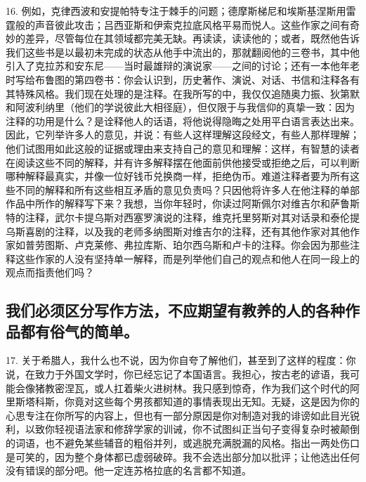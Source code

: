 16. 例如，克律西波和安提帕特专注于棘手的问题；德摩斯梯尼和埃斯基涅斯用雷霆般的声音彼此攻击；吕西亚斯和伊索克拉底风格平易而悦人。这些作家之间有奇妙的差异，尽管每位在其领域都完美无缺。再读读，读读他的；或者，既然他告诉我们这些书是以最初未完成的状态从他手中流出的，那就翻阅他的三卷书，其中他引入了克拉苏和安东尼——当时最雄辩的演说家——之间的讨论；还有一本他年老时写给布鲁图的第四卷书：你会认识到，历史著作、演说、对话、书信和注释各有其特殊风格。我们现在处理的是注释。在我所写的中，我仅仅追随奥力振、狄第默和阿波利纳里（他们的学说彼此大相径庭），但仅限于与我信仰的真挚一致：因为注释的功用是什么？是诠释他人的话语，将他说得隐晦之处用平白语言表达出来。因此，它列举许多人的意见，并说：有些人这样理解这段经文，有些人那样理解；他们试图用如此这般的证据或理由来支持自己的意见和理解：这样，有智慧的读者在阅读这些不同的解释，并有许多解释摆在他面前供他接受或拒绝之后，可以判断哪种解释最真实，并像一位好钱币兑换商一样，拒绝伪币。难道注释者要为所有这些不同的解释和所有这些相互矛盾的意见负责吗？只因他将许多人在他注释的单部作品中所作的解释写下来？我想，当你年轻时，你读过阿斯佩尔对维吉尔和萨鲁斯特的注释，武尔卡提乌斯对西塞罗演说的注释，维克托里努斯对其对话录和泰伦提乌斯喜剧的注释，以及我的老师多纳图斯对维吉尔的注释，还有其他作家对其他作家如普劳图斯、卢克莱修、弗拉库斯、珀尔西乌斯和卢卡的注释。你会因为那些注释这些作家的人没有坚持单一解释，而是列举他们自己的观点和他人在同一段上的观点而指责他们吗？\par


\subsection{我们必须区分写作方法，不应期望有教养的人的各种作品都有俗气的简单。}

17. 关于希腊人，我什么也不说，因为你自夸了解他们，甚至到了这样的程度：你说，在致力于外国文学时，你已经忘记了本国语言。我担心，按古老的谚语，我可能会像猪教密涅瓦，或人扛着柴火进树林。我只感到惊奇，作为我们这个时代的阿里斯塔科斯，你竟对这些每个男孩都知道的事情表现出无知。无疑，这是因为你的心思专注在你所写的内容上，但也有一部分原因是你对制造对我的诽谤如此目光锐利，以致你轻视语法家和修辞学家的训诫，你不试图纠正当句子变得复杂时被颠倒的词语，也不避免某些辅音的粗俗并列，或逃脱充满脱漏的风格。指出一两处伤口是可笑的，因为整个身体都已虚弱破碎。我不会选出部分加以批评；让他选出任何没有错误的部分吧。他一定连苏格拉底的名言都不知道。\par

